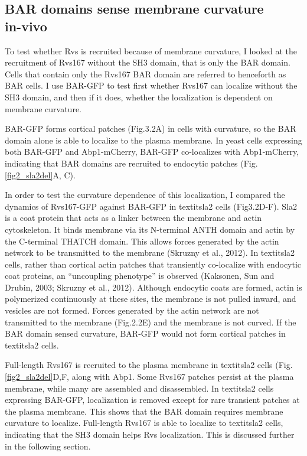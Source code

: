 	\subsection{BAR domains sense membrane curvature \\ in-vivo}
\label{sub_curvature}

To test whether Rvs is recruited because of membrane curvature, I looked at the recruitment of Rvs167 without the SH3 domain, that is only the BAR domain. Cells that contain only the Rvs167 BAR domain are referred to henceforth as BAR cells. I use BAR-GFP to test first whether Rvs167 can localize without the SH3 domain, and then if it does, whether the localization is dependent on membrane curvature.

BAR-GFP forms cortical patches (Fig.3.2A) in cells with curvature, so the BAR domain alone is able to localize to the plasma membrane. In yeast cells expressing both BAR-GFP and Abp1-mCherry, BAR-GFP co-localizes with Abp1-mCherry, indicating that BAR domains are recruited to endocytic patches  (Fig.\ref{fig2_sla2del}A, C).  



	\vspace{5mm}
In order to test the curvature dependence of this localization, I compared the dynamics of Rvs167-GFP against BAR-GFP in textit{sla2\textDelta} cells (Fig3.2D-F). Sla2 is a coat protein that acts as a linker between the membrane and actin cytoskeleton. It binds membrane via its N-terminal ANTH domain and actin by the C-terminal THATCH domain. This allows forces generated by the actin network to be transmitted to the membrane (Skruzny et al., 2012). In textit{sla2\textDelta} cells, rather than cortical actin patches that transiently co-localize with endocytic coat proteins, an “uncoupling phenotype” is observed (Kaksonen, Sun and Drubin, 2003; Skruzny et al., 2012). Although endocytic coats are formed, actin is polymerized continuously at these sites, the membrane is not pulled inward, and vesicles are not formed. Forces generated by the actin network are not transmitted to the membrane (Fig.2.2E) and the membrane is not curved. If the BAR domain sensed curvature, BAR-GFP would not form cortical patches in textit{sla2\textDelta} cells.



Full-length Rvs167 is recruited to the plasma membrane in textit{sla2\textDelta} cells  (Fig.\ref{fig2_sla2del}D,F, along with Abp1. Some Rvs167 patches persist at the plasma membrane, while many are assembled and disassembled. In textit{sla2\textDelta} cells expressing BAR-GFP, localization is removed except for rare transient patches at the plasma membrane. This shows that the BAR domain requires membrane curvature to localize. Full-length Rvs167 is able to localize to textit{sla2\textDelta} cells, indicating that the SH3 domain helps Rvs localization. This is discussed further in the following section. 





